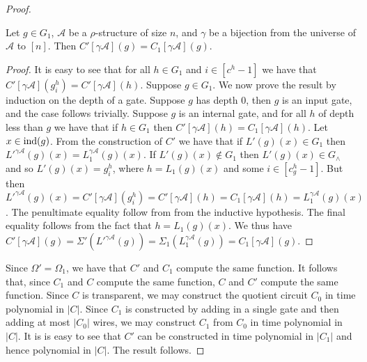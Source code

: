 \documentclass[../paper.tex]{subfiles}
\begin{document}
\begin{proof}
  \begin{claim}
    Let $g \in G_1$, $\mathcal{A}$ be a $\rho$-structure of size $n$, and
    $\gamma$ be a bijection from the universe of $\mathcal{A}$ to $[n]$. Then
    $C'[\gamma \mathcal{A}](g) = C_1[\gamma \mathcal{A}](g)$.
  \end{claim}
  \begin{proof}
    It is easy to see that for all $h \in G_1$ and $i \in [c^h-1]$ we have that
    $C'[\gamma \mathcal{A}](g^h_i) = C'[\gamma \mathcal{A}](h)$. Suppose $g \in
    G_1$. We now prove the result by induction on the depth of a gate. Suppose
    $g$ has depth $0$, then $g$ is an input gate, and the case follows
    trivially. Suppose $g$ is an internal gate, and for all $h$ of depth less
    than $g$ we have that if $h \in G_1$ then $C'[\gamma \mathcal{A}](h) =
    C_1[\gamma \mathcal{A}](h)$. Let $x \in \text{\upshape ind}(g)$. From the construction of
    $C'$ we have that if $L'(g)(x) \in G_1$ then ${L'}^{\gamma
      \mathcal{A}}(g)(x) = L^{\gamma \mathcal{A}}_1(g)(x)$. If $L'(g)(x) \not\in
    G_1$ then $L'(g)(x) \in G_{\land}$ and so $L'(g)(x) = g^h_i$, where $h =
    L_1(g)(x)$ and some $i \in [c^h_g -1]$. But then ${L'}^{\gamma
      \mathcal{A}}(g)(x) = C'[\gamma \mathcal{A}](g^h_i) = C'[\gamma
    \mathcal{A}](h) = C_1[\gamma \mathcal{A}](h) = L^{\gamma
      \mathcal{A}}_1(g)(x)$. The penultimate equality follow from from the
    inductive hypothesis. The final equality follows from the fact that $h = L_1
    (g)(x)$. We thus have $C'[\gamma \mathcal{A}](g) = \Sigma'({L'}^{\gamma
      \mathcal{A}}(g)) = \Sigma_1 (L^{\gamma \mathcal{A}}_1(g)) = C_1[\gamma
    \mathcal{A}](g)$.
  \end{proof}

  Since $\Omega' = \Omega_1$, we have that $C'$ and $C_1$ compute the same
  function. It follows that, since $C_1$ and $C$ compute the same function, $C$
  and $C'$ compute the same function. Since $C$ is transparent, we may construct
  the quotient circuit $C_0$ in time polynomial in $\vert C \vert$. Since $C_1$
  is constructed by adding in a single gate and then adding at most $\vert C_0
  \vert$ wires, we may construct $C_1$ from $C_0$ in time polynomial in $\vert C
  \vert$. It is is easy to see that $C'$ can be constructed in time polynomial
  in $\vert C_1 \vert$ and hence polynomial in $\vert C \vert$. The result
  follows.


\end{proof}
\end{document}
